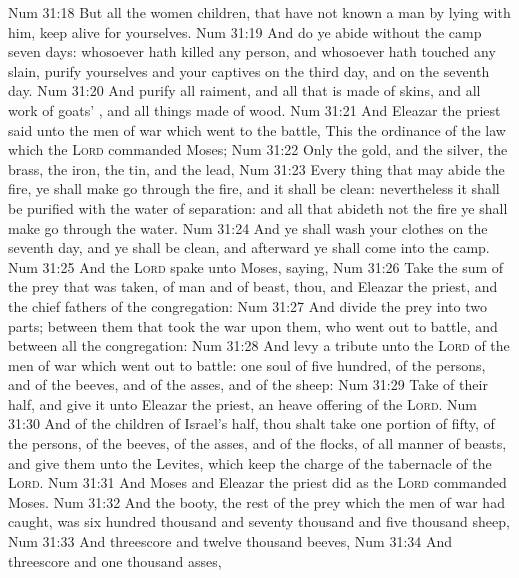 \vs Num 31:18 But all the women children, that have not known a man by lying with him, keep alive for yourselves.
\vs Num 31:19 And do ye abide without the camp seven days: whosoever hath killed any person, and whosoever hath touched any slain, purify  yourselves and your captives on the third day, and on the seventh day.
\vs Num 31:20 And purify all  raiment, and all that is made of skins, and all work of goats' , and all things made of wood.
\vs Num 31:21 And Eleazar the priest said unto the men of war which went to the battle, This  the ordinance of the law which the \textsc{Lord} commanded Moses;
\vs Num 31:22 Only the gold, and the silver, the brass, the iron, the tin, and the lead,
\vs Num 31:23 Every thing that may abide the fire, ye shall make  go through the fire, and it shall be clean: nevertheless it shall be purified with the water of separation: and all that abideth not the fire ye shall make go through the water.
\vs Num 31:24 And ye shall wash your clothes on the seventh day, and ye shall be clean, and afterward ye shall come into the camp.
\vs Num 31:25 And the \textsc{Lord} spake unto Moses, saying,
\vs Num 31:26 Take the sum of the prey that was taken,  of man and of beast, thou, and Eleazar the priest, and the chief fathers of the congregation:
\vs Num 31:27 And divide the prey into two parts; between them that took the war upon them, who went out to battle, and between all the congregation:
\vs Num 31:28 And levy a tribute unto the \textsc{Lord} of the men of war which went out to battle: one soul of five hundred,  of the persons, and of the beeves, and of the asses, and of the sheep:
\vs Num 31:29 Take  of their half, and give it unto Eleazar the priest,  an heave offering of the \textsc{Lord}.
\vs Num 31:30 And of the children of Israel's half, thou shalt take one portion of fifty, of the persons, of the beeves, of the asses, and of the flocks, of all manner of beasts, and give them unto the Levites, which keep the charge of the tabernacle of the \textsc{Lord}.
\vs Num 31:31 And Moses and Eleazar the priest did as the \textsc{Lord} commanded Moses.
\vs Num 31:32 And the booty,  the rest of the prey which the men of war had caught, was six hundred thousand and seventy thousand and five thousand sheep,
\vs Num 31:33 And threescore and twelve thousand beeves,
\vs Num 31:34 And threescore and one thousand asses,
